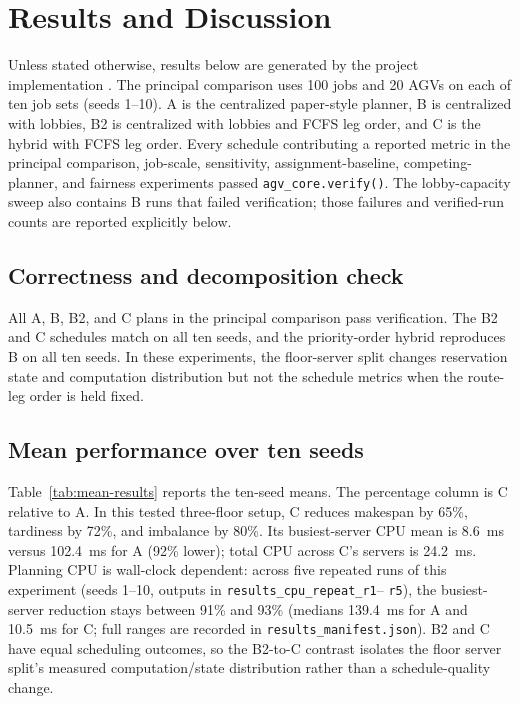\section{Results and Discussion}
\label{sec:results-discussion}

Unless stated otherwise, results below are generated by the project
implementation \cite{projectRepo}. The principal comparison uses 100
jobs and 20 AGVs on each of ten job sets (seeds 1--10). A is the centralized
paper-style planner, B is centralized with lobbies, B2 is centralized with
lobbies and FCFS leg order, and C is the hybrid with FCFS leg order. Every
schedule contributing a reported metric in the principal comparison,
job-scale, sensitivity, assignment-baseline, competing-planner, and fairness
experiments passed \texttt{agv\_core.verify()}. The lobby-capacity sweep also
contains B runs that failed verification; those failures and verified-run
counts are reported explicitly below.

\subsection{Correctness and decomposition check}

All A, B, B2, and C plans in the principal comparison pass verification. The
B2 and C schedules match on all ten seeds, and the
priority-order hybrid reproduces B on all ten seeds. In these experiments,
the floor-server split changes reservation state and computation distribution
but not the schedule metrics when the route-leg order is held fixed.

\subsection{Mean performance over ten seeds}

Table~\ref{tab:mean-results} reports the ten-seed means. The percentage
column is C relative to A. In this tested three-floor setup, C reduces
makespan by 65\%, tardiness by
72\%, and imbalance by 80\%. Its busiest-server CPU mean is 8.6~ms versus
102.4~ms for A (92\% lower); total CPU across C's servers is 24.2~ms.
Planning CPU is wall-clock dependent: across five repeated runs of this
experiment (seeds 1--10, outputs in \texttt{results\_cpu\_repeat\_r1}--%
\texttt{r5}), the busiest-server reduction stays between 91\% and 93\%
(medians 139.4~ms for A and 10.5~ms for C; full ranges are recorded in
\texttt{results\_manifest.json}). B2 and C
have equal scheduling outcomes, so the B2-to-C contrast isolates the floor
server split's measured computation/state distribution rather than a
schedule-quality change.

